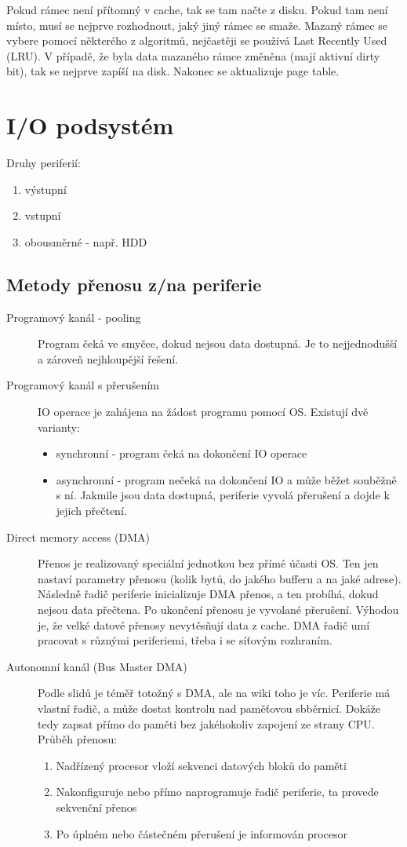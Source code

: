 \documentclass[10pt,a4paper,openright]{article}
\begin{document}
Pokud rámec není přítomný v cache, tak se tam načte z disku. Pokud tam není místo, musí se nejprve rozhodnout, jaký jiný rámec se smaže. Mazaný rámec se vybere pomocí některého z algoritmů, nejčastěji se používá Last Recently Used (LRU). V případě, že byla data mazaného rámce změněna (mají aktivní dirty bit), tak se nejprve zapíší na disk. Nakonec se aktualizuje page table.

\section{I/O podsystém}
Druhy periferií:
\begin{enumerate}
\item výstupní
\item vstupní
\item obousměrné - např. HDD
\end{enumerate}

\subsection{Metody přenosu z/na periferie}
\begin{description}

\item[Programový kanál - pooling] Program čeká ve smyčce, dokud nejsou data dostupná. Je to nejjednodušší a zároveň nejhloupější řešení.
\item[Programový kanál s přerušením] IO operace je zahájena na žádost programu pomocí OS. Existují dvě varianty:
	\begin{itemize}
	\item synchronní - program čeká na dokončení IO operace
	\item asynchronní - program nečeká na dokončení IO a může běžet souběžně s ní. Jakmile jsou data dostupná, periferie vyvolá přerušení a dojde k jejich přečtení.
	\end{itemize}
\item[Direct memory access (DMA)] Přenos je realizovaný speciální jednotkou bez přímé účasti OS. Ten jen nastaví parametry přenosu (kolik bytů, do jakého bufferu a na jaké adrese). Následně řadič periferie inicializuje DMA přenos, a ten probíhá, dokud nejsou data přečtena. Po ukončení přenosu je vyvolané přerušení. Výhodou je, že velké datové přenosy nevytěsňují data z cache. DMA řadič umí pracovat s různými periferiemi, třeba i se síťovým rozhraním.
\item[Autonomní kanál (Bus Master DMA)] Podle slidů je téměř totožný s DMA, ale na wiki toho je víc. Periferie má vlastní řadič, a může dostat kontrolu nad paměťovou sbběrnicí. Dokáže tedy zapsat přímo do paměti bez jakéhokoliv zapojení ze strany CPU. Průběh přenosu:
	\begin{enumerate}
	\item Nadřízený procesor vloží sekvenci datových bloků do paměti
	\item Nakonfiguruje nebo přímo naprogramuje řadič periferie, ta provede sekvenční přenos
	\item Po úplném nebo částečném přerušení je informován procesor
	\end{enumerate}
\end{description}
\end{document}

